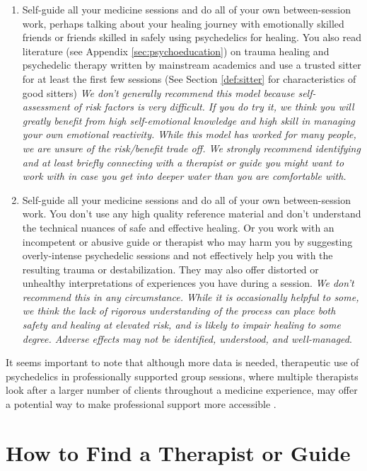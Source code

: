 \documentclass[12pt,letterpaper]{book}
\begin{document}
\begin{enumerate}
    \item Self-guide all your medicine sessions and do all of your own between-session work, perhaps talking about your healing journey with emotionally skilled friends or friends skilled in safely using psychedelics for healing. You also read literature (see Appendix \ref{sec:psychoeducation}) on trauma healing and psychedelic therapy written by mainstream academics and use a trusted sitter for at least the first few sessions (See Section \ref{def:sitter} for characteristics of good sitters) \textit{We don't generally recommend this model because self-assessment of risk factors is very difficult. If you do try it, we think you will greatly benefit from high self-emotional knowledge and high skill in managing your own emotional reactivity. While this model has worked for many people, we are unsure of the risk/benefit trade off. We strongly recommend identifying and at least briefly connecting with a therapist or guide you might want to work with in case you get into deeper water than you are comfortable with.}
    \item Self-guide all your medicine sessions and do all of your own between-session work. You don't use any high quality reference material and don't understand the technical nuances of safe and effective healing. Or you work with an incompetent or abusive guide or therapist who may harm you by suggesting overly-intense psychedelic sessions and not effectively help you with the resulting trauma or destabilization. They may also offer distorted or unhealthy interpretations of experiences you have during a session. \textit{We don't recommend this in any circumstance. While it is occasionally helpful to some, we think the lack of rigorous understanding of the process can place both safety and healing at elevated risk, and is likely to impair healing to some degree. Adverse effects may not be identified, understood, and well-managed}.
\end{enumerate}
It seems important to note that although more data is needed, therapeutic use of psychedelics in professionally supported group sessions, where multiple therapists look after a larger number of clients throughout a medicine experience, may offer a potential way to make professional support more accessible \cite{marseille2023group}.

\section{How to Find a Therapist or Guide}
\label{sec:howtofind}
\end{document}
